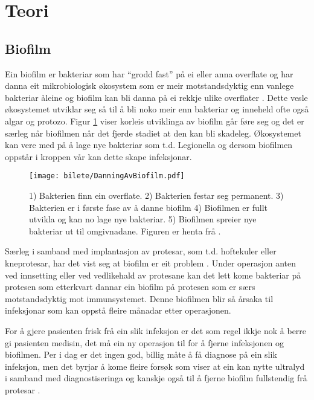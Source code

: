 \section{Teori}
\subsection{Biofilm}
Ein biofilm er bakteriar som har ``grodd fast'' på ei eller anna overflate og har danna eit mikrobiologisk økosystem som er meir motstandsdyktig enn vanlege bakteriar åleine og biofilm kan bli danna på ei rekkje ulike overflater \cite{biofilm}\cite{biofilm2}. Dette vesle økosystemet utviklar seg så til å bli noko meir enn bakteriar og inneheld ofte også algar og protozo. Figur \ref{fig:biofilm} viser korleis utviklinga av biofilm går føre seg og det er særleg når biofilmen når det fjerde stadiet at den kan bli skadeleg. Økosystemet kan vere med på å lage nye bakteriar som t.d. Legionella \cite{biofilm} og dersom biofilmen oppstår i kroppen vår kan dette skape infeksjonar.

\begin{figure}[htbp]
	\centering
	\texttt{[image: bilete/DanningAvBiofilm.pdf]}
  	\caption[Dei fem fasane i biofilmdanning]{1) Bakterien finn ein overflate. 2) Bakterien festar seg permanent. 3) Bakterien er i første fase av å danne biofilm 	4) Biofilmen er fullt utvikla og kan no lage nye bakteriar. 5) Biofilmen spreier nye bakteriar ut til omgivnadane. Figuren er henta frå \cite{biofilmfigur}.}
  	\label{fig:biofilm}
\end{figure}

Særleg i samband med implantasjon av protesar, som t.d. hoftekuler eller kneprotesar, har det vist seg at biofilm er eit problem \cite{ultraprotese}. Under operasjon anten ved innsetting eller ved vedlikehald av protesane kan det lett kome bakteriar på protesen som etterkvart dannar ein biofilm på protesen som er særs motstandsdyktig mot immunsystemet. Denne biofilmen blir så årsaka til infeksjonar som kan oppstå fleire månadar etter operasjonen. 

For å gjere pasienten frisk frå ein slik infeksjon er det som regel ikkje nok å berre gi pasienten medisin, det må ein ny operasjon til for å fjerne infeksjonen og biofilmen\cite{infection}. Per i dag er det ingen god, billig måte å få diagnose på ein slik infeksjon, men det byrjar å kome fleire forsøk som viser at ein kan nytte ultralyd i samband med diagnostiseringa og kanskje også til å fjerne biofilm fullstendig frå protesar \cite{ultraprotese}.

